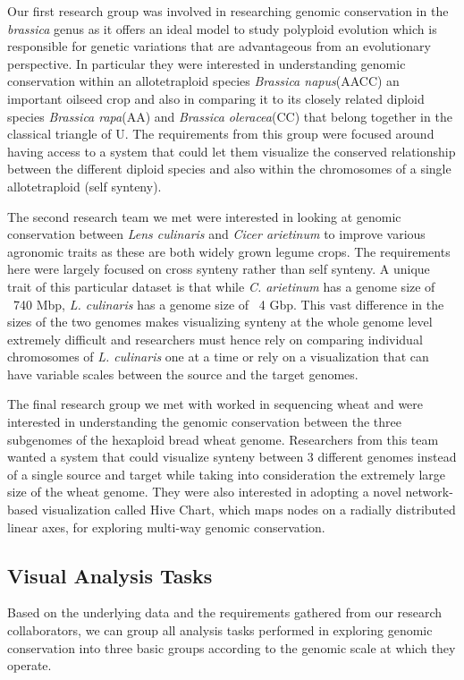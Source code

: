 Our first research group was involved in researching genomic conservation in the \textit{brassica} genus as it offers an ideal model to study polyploid evolution which is responsible for genetic variations that are advantageous from an evolutionary perspective\cite{madlung2013polyploidy,liu2014brassica}. In particular they were interested in understanding genomic conservation within an allotetraploid species \textit{Brassica napus}(AACC) an important oilseed crop and also in comparing it to its closely related diploid species \textit{Brassica rapa}(AA) and \textit{Brassica oleracea}(CC) that belong together in the classical triangle of U\cite{nagaharu1935genome}. The requirements from this group were focused around having access to a system that could let them visualize the conserved relationship between the different diploid species and also within the chromosomes of a single allotetraploid (self synteny). 

The second research team we met were interested in looking at genomic conservation between \textit{Lens culinaris} and \textit{Cicer arietinum} to improve various agronomic traits as these are both widely grown legume crops. The requirements here were largely focused on cross synteny rather than self synteny. A unique trait of this particular dataset is that while \textit{C. arietinum} has a genome size of ~740 Mbp, \textit{L. culinaris} has a genome size of ~4 Gbp. This vast difference in the sizes of the two genomes makes visualizing synteny at the whole genome level extremely difficult and researchers must hence rely on comparing individual chromosomes of \textit{L. culinaris} one at a time or rely on a visualization that can have variable scales between the source and the target genomes.


The final research group we met with worked in sequencing wheat and were interested in understanding the genomic conservation between the three subgenomes of the hexaploid bread wheat genome. Researchers from this team wanted a system that could visualize synteny between 3 different genomes instead of a single source and target while taking into consideration the extremely large size of the wheat genome. They were also interested in adopting a novel network-based visualization called Hive Chart, which maps nodes on a radially distributed linear axes, for exploring multi-way genomic conservation.

\subsection{Visual Analysis Tasks}
Based on the underlying data and the requirements gathered from our research collaborators, we can group all analysis tasks performed in exploring genomic conservation into three basic groups according to the genomic scale at which they operate.

